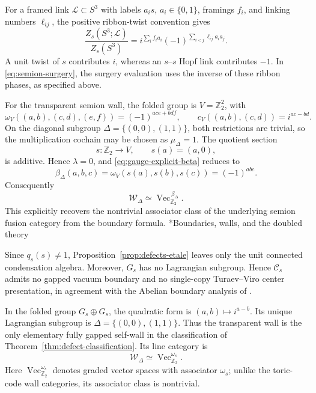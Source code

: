 \documentclass[12pt]{amsart}
\makeatletter
\renewcommand\subsection{\@startsection{subsection}{2}%
  \z@{.5\linespacing\@plus.7\linespacing}{-.5em}%
  {\normalfont\bfseries}}
\numberwithin{equation}{section}
\theoremstyle{definition}
\makeatother
\begin{document}
For a framed link $\mathscr L\subset S^3$ with labels $a_i s$,
$a_i\in\{0,1\}$, framings $f_i$, and linking numbers $\ell_{ij}$,
the positive ribbon-twist convention gives
\begin{equation}
\label{eq:semion-wilson}
\frac{Z_s(S^3;\mathscr L)}{Z_s(S^3)}
=i^{\sum_i f_i a_i}
(-1)^{\sum_{i<j}\ell_{ij}a_i a_j}.
\end{equation}
A unit twist of $s$ contributes $i$, whereas an $s$--$s$ Hopf link
contributes $-1$. In \eqref{eq:semion-surgery}, the surgery evaluation
uses the inverse of these ribbon phases, as specified above.

For the transparent semion wall, the folded group is
$V=\mathbb Z_2^2$, with
$$
\omega_V((a,b),(c,d),(e,f))=(-1)^{ace+bdf},
\qquad
c_V((a,b),(c,d))=i^{ac-bd}.
$$
On the diagonal subgroup
$\Delta=\{(0,0),(1,1)\}$, both restrictions are trivial, so the
multiplication cochain may be chosen as $\mu_\Delta=1$.
The quotient section
$$
s:\mathbb Z_2\longrightarrow V,\qquad s(a)=(a,0),
$$
is additive. Hence $\lambda=0$, and
\eqref{eq:gauge-explicit-beta} reduces to
$$
\beta_\Delta(a,b,c)
=\omega_V(s(a),s(b),s(c))
=(-1)^{abc}.
$$
Consequently
$$
\mathcal W_\Delta
\simeq\operatorname{Vec}_{\mathbb Z_2}^{\,\beta_\Delta}.
$$
This explicitly recovers the nontrivial associator class of the
underlying semion fusion category from the boundary formula.
\subsection*{Boundaries, walls, and the doubled theory}

Since $q_s(s)\ne1$, Proposition~\ref{prop:defects-etale} leaves only
the unit connected condensation algebra. Moreover, $G_s$ has no
Lagrangian subgroup. Hence $\mathcal C_s$ admits no gapped vacuum
boundary and no single-copy Turaev--Viro center presentation,
in agreement with the Abelian boundary analysis of
\cite{Kapustin2010}.

In the folded group $G_s\oplus G_s$, the quadratic form is
$(a,b)\mapsto i^{a-b}$. Its unique Lagrangian subgroup is
$\Delta=\{(0,0),(1,1)\}$. Thus the transparent wall is the only
elementary fully gapped self-wall in the classification of
Theorem~\ref{thm:defect-classification}. Its line category is
$$
\mathcal W_\Delta\simeq
\operatorname{Vec}_{\mathbb Z_2}^{\omega_s}.
$$
Here $\operatorname{Vec}_{\mathbb Z_2}^{\omega_s}$ denotes graded vector
spaces with associator $\omega_s$; unlike the toric-code wall categories,
its associator class is nontrivial.
\end{document}
